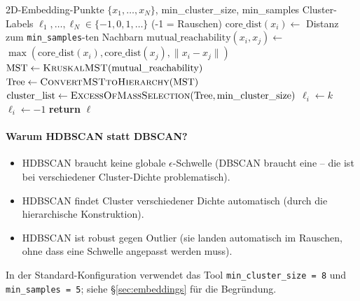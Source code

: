 \documentclass[11pt,a4paper,twoside]{article}
\theoremstyle{remark}
\begin{document}
\begin{algorithm}[H]
\caption{\textsc{HDBSCANCluster}}
\begin{algorithmic}[1]
\Require 2D-Embedding-Punkte $\{x_1, \ldots, x_N\}$,
         min\_cluster\_size, min\_samples
\Ensure Cluster-Labels $\ell_1, \ldots, \ell_N \in \{-1, 0, 1, \ldots\}$
       (-1 = Rauschen)
\State {}
\State $\text{core\_dist}(x_i) \gets$ Distanz zum \texttt{min\_samples}-ten Nachbarn
\State $\text{mutual\_reachability}(x_i, x_j) \gets$
       $\max(\text{core\_dist}(x_i), \text{core\_dist}(x_j),
       \|x_i - x_j\|)$
\State {}
\State $\text{MST} \gets \textsc{KruskalMST}(\text{mutual\_reachability})$
\State {}
\State $\text{Tree} \gets \textsc{ConvertMSTtoHierarchy}(\text{MST})$
\State {}
\State $\text{cluster\_list} \gets \textsc{ExcessOfMassSelection}(\text{Tree},
       \text{min\_cluster\_size})$
\State {}
    \State $\ell_i \gets k$
  \Else
    \State $\ell_i \gets -1$  
  \EndIf
\EndFor
\State \textbf{return} $\boldsymbol{\ell}$
\end{algorithmic}
\end{algorithm}

\paragraph{Warum HDBSCAN statt DBSCAN?}
\begin{itemize}\setlength{\itemsep}{0pt}
  \item HDBSCAN braucht keine globale $\epsilon$-Schwelle (DBSCAN
        braucht eine -- die ist bei verschiedener Cluster-Dichte
        problematisch).
  \item HDBSCAN findet Cluster verschiedener Dichte automatisch (durch
        die hierarchische Konstruktion).
  \item HDBSCAN ist robust gegen Outlier (sie landen automatisch im
        Rauschen, ohne dass eine Schwelle angepasst werden muss).
\end{itemize}

In der Standard-Konfiguration verwendet das Tool
\texttt{min\_cluster\_size = 8} und \texttt{min\_samples = 5}; siehe
\S\ref{sec:embeddings} f\"ur die Begr\"undung.
\end{document}
